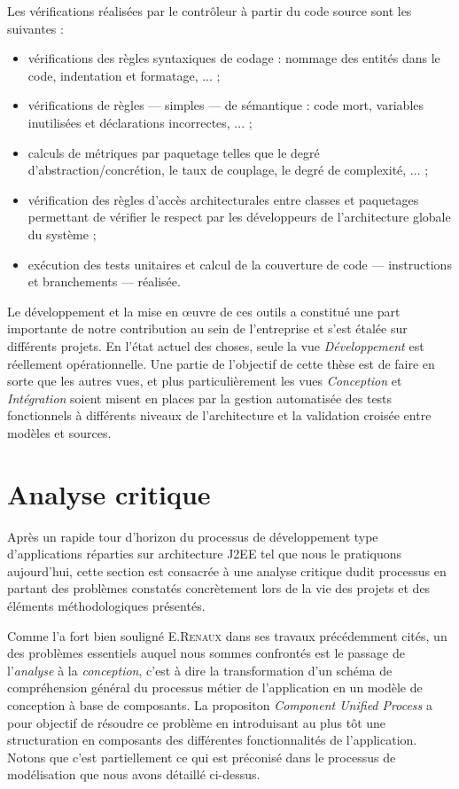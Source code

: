 Les v\'erifications r\'ealis\'ees par le contr\^oleur \`a partir
du code source sont les suivantes :
\begin{itemize}
  \item v\'erifications des r\`egles syntaxiques de codage : nommage
  des entit\'es dans le code, indentation et formatage, ... ;
\item v\'erifications de r\`egles --- simples --- de s\'emantique :
  code mort, variables inutilis\'ees et d\'eclarations incorrectes,
  ... ;
\item calculs de m\'etriques par paquetage telles que le degr\'e
  d'abstraction/concr\'etion, le taux de couplage, le degr\'e de
  complexit\'e, ... ;
\item v\'erification des r\`egles d'acc\`es architecturales entre
  classes et paquetages permettant de v\'erifier le respect par les
  d\'eveloppeurs de l'architecture globale  du syst\`eme ;
\item ex\'ecution des tests unitaires et calcul de la couverture de
  code --- instructions et branchements --- r\'ealis\'ee.
\end{itemize}

Le d\'eveloppement et la mise en \oe uvre de ces outils a
constitu\'e une part importante  de notre contribution au sein de
l'entreprise et s'est \'etal\'ee sur diff\'erents projets. En l'\'etat actuel des choses, seule la
vue \emph{D\'eveloppement} est r\'eellement op\'erationnelle. Une
partie de l'objectif de cette th\`ese est de faire en sorte que les
autres vues, et plus particuli\`erement les vues \emph{Conception} et
\emph{Int\'egration} soient misent en places par la gestion
automatis\'ee des tests fonctionnels \`a diff\'erents niveaux de
l'architecture et la validation crois\'ee entre mod\`eles et
sources. 

\section{Analyse critique}
\label{sec:analyse-critique}
Apr\`es un rapide tour d'horizon du processus de d\'eveloppement
type d'applications r\'eparties sur architecture \textsf{J2EE} tel
que nous le pratiquons aujourd'hui, cette section est consacr\'ee
\`a une analyse critique dudit processus en partant des probl\`emes
constat\'es concr\`etement lors de la vie des projets et des
\'el\'ements m\'ethodologiques pr\'esent\'es. 

Comme l'a fort bien soulign\'e E.\textsc{Renaux} dans ses travaux
pr\'ec\'edemment cit\'es, un des probl\`emes essentiels auquel
nous sommes confront\'es est le passage de l'\emph{analyse} \`a la
\emph{conception}, c'est \`a dire la transformation d'un sch\'ema de
compr\'ehension g\'en\'eral du processus m\'etier de l'application
en un mod\`ele de conception \`a base de composants. La propositon
\emph{Component Unified Process}\cite{manu-cup-lmo,these-manu} a pour objectif de r\'esoudre ce
probl\`eme en introduisant au plus t\^ot une structuration en
composants des diff\'erentes fonctionnalit\'es de
l'application. Notons que c'est partiellement ce qui est
pr\'econis\'e dans le processus de mod\'elisation que nous avons
d\'etaill\'e ci-dessus. 

